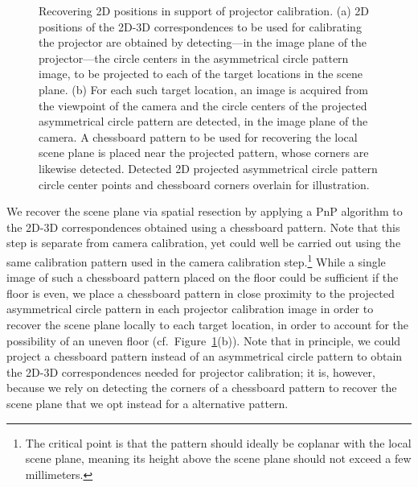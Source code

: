 \documentclass[review]{elsarticle}
\begin{document}
\begin{figure}
    \centering
    \qquad
    \caption{Recovering 2D positions in support of projector calibration. (a) 2D positions of the 2D-3D correspondences to be used for calibrating the projector are obtained by detecting---in the image plane of the projector---the circle centers in the asymmetrical circle pattern image, to be projected to each of the target locations in the scene plane. (b) For each such target location, an image is acquired from the viewpoint of the camera and the circle centers of the projected asymmetrical circle pattern are detected, in the image plane of the camera. A chessboard pattern to be used for recovering the local scene plane is placed near the projected pattern, whose corners are likewise detected. Detected 2D projected asymmetrical circle pattern circle center points and chessboard corners overlain for illustration.}
    \label{fig:2d}
\end{figure}

We recover the scene plane via spatial resection by applying a PnP algorithm \cite{collins2014infinitesimal} to the 2D-3D correspondences obtained using a chessboard pattern. Note that this step is separate from camera calibration, yet could well be carried out using the same calibration pattern used in the camera calibration step.\footnote{The critical point is that the pattern should ideally be coplanar with the local scene plane, meaning its height above the scene plane should not exceed a few millimeters.} While a single image of such a chessboard pattern placed on the floor could be sufficient if the floor is even, we place a chessboard pattern in close proximity to the projected asymmetrical circle pattern in each projector calibration image in order to recover the scene plane locally to each target location, in order to account for the possibility of an uneven floor (cf.\ Figure~\ref{fig:2d}(b)). Note that in principle, we could project a chessboard pattern instead of an asymmetrical circle pattern to obtain the 2D-3D correspondences needed for projector calibration; it is, however, because we rely on detecting the corners of a chessboard pattern to recover the scene plane that we opt instead for a alternative pattern.
\end{document}
